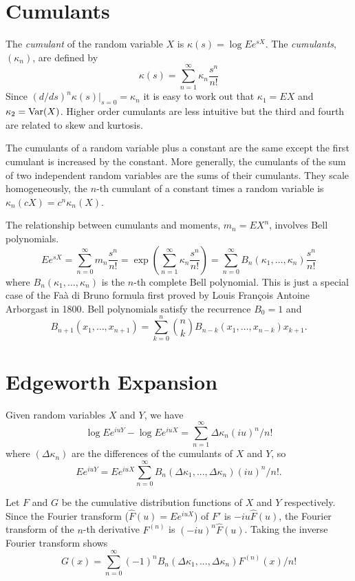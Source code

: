 \documentclass[11pt]{article}
\newcommand{\Var}{\mathop{\rm{Var}}}
\theoremstyle{definition}
\begin{document}
\section{Cumulants}

The {\em cumulant} of the random variable \(X\)
is \(\kappa(s) = \log Ee^{sX}\).
The {\em cumulants}, \((\kappa_n)\),
are defined by
\[
\kappa(s) = \sum_{n=1}^\infty \kappa_n \frac{s^n}{n!}
\]
Since \((d/ds)^n\kappa(s)|_{s = 0} = \kappa_n\) it is easy to
work out that
\(\kappa_1 = EX\) and \(\kappa_2 = \Var(X)\). Higher order
cumulants are less intuitive but the third and fourth are
related to skew and kurtosis.

The cumulants of a random variable plus a constant are the 
same except the first cumulant is increased by the constant.
More generally, the cumulants of the sum of two independent 
random variables are the sums of their cumulants.
They scale homogeneously, the \(n\)-th cumulant of a constant
times a random variable is
\(\kappa_n(cX) = c^n\kappa_n(X)\).

The relationship between cumulants and moments, \(m_n = EX^n\),
involves Bell
polynomials\cite{Bel1934}.
\[
Ee^{sX} = \sum_{n=0}^\infty m_n \frac{s^n}{n!}
 = \exp(\sum_{n=1}^\infty \kappa_n \frac{s^n}{n!})
= \sum_{n=0}^\infty B_n(\kappa_1,\dots,\kappa_n) \frac{s^n}{n!}
\]
where \(B_n(\kappa_1,\dots,\kappa_n)\) is the \(n\)-th complete
Bell polynomial.
This is just a special case of the
Fa\`a di Bruno formula first proved by Louis Fran\c{c}ois Antoine
Arborgast in 1800\cite{Arb1800}.
Bell polynomials satisfy the recurrence \cite{Com1974} \(B_0 = 1\) and
\[
B_{n+1}(x_1,\dots,x_{n+1}) = \sum_{k=0}^n \binom{n}{k}
B_{n - k}(x_1,\dots, x_{n - k}) x_{k+1}.
\]

\section{Edgeworth Expansion}
Given random
variables \(X\) and \(Y\), we have
\[\log E e^{iuY} - \log E e^{iuX} = \sum_{n=1}^\infty \Delta\kappa_n (iu)^n/n!\]
where \((\Delta\kappa_n)\) are the differences of the cumulants 
of \(X\) and \(Y\), so
\[
Ee^{iuY} = Ee^{iuX}\sum_{n=0}^\infty B_n(\Delta\kappa_1,...,\Delta\kappa_n)(iu)^n/n!.
\]

Let \(F\) and \(G\) be the cumulative distribution functions of
\(X\) and \(Y\) respectively.
Since the Fourier transform (\(\hat{F}(u) = Ee^{iuX}\))
of \(F'\) is \(-iu \hat F(u)\),
the Fourier transform of the \(n\)-th derivative
\(F^{(n)}\) is \((-iu)^n\hat F(u)\).
Taking the inverse Fourier transform shows
\[
	G(x) = \sum_{n=0}^\infty (-1)^n B_n(\Delta\kappa_1,...,\Delta\kappa_n)
	F^{(n)}(x)/n!
\]
\end{document}
